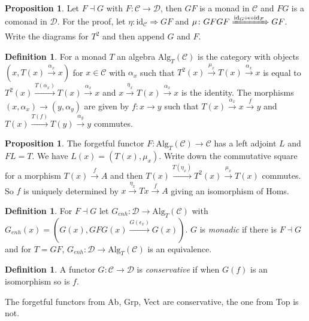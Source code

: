 \documentclass[a4paper,10pt]{article}
\theoremstyle{definition}
\newtheorem{definition}[theorem]{Definition}
\newtheorem{proposition}[theorem]{Proposition}
\newcommand{\C}{\mathcal{C}}
\newcommand{\D}{\mathcal{D}}
\newcommand{\id}{\mathrm{id}}
\begin{document}
\begin{proposition}
    Let $F \dashv G$ with $F \colon \C \rightarrow \D$, then $GF$ is a monad in $\C$ and $FG$ is a comonad in $\D$.
    For the proof, let $\eta \colon \id_\C \Rightarrow GF$  and $\mu \colon GFGF \xRightarrow{\id_G \circ \epsilon \circ \id_F} GF$. Write the diagrams for $T^2$ and then append $G$ and $F$.
\end{proposition}

\begin{definition}
    For a monad $T$ an algebra $\mathrm{Alg}_T(\C)$ is the category with objects $(x, T(x) \xrightarrow {\alpha_x} x)$ for $x \in \C$ with $\alpha_x$ such that $T^2(x) \xrightarrow{\mu_x} T(x) \xrightarrow{\alpha_x} x$ is equal to $T^2(x) \xrightarrow{T(\alpha_x)} T(x) \xrightarrow{\alpha_x} x$ and $x \xrightarrow{\eta_x} T(x) \xrightarrow{\alpha_x} x$ is the identity. The morphisms $(x, \alpha_x) \rightarrow (y, \alpha_y)$ are given by $f \colon x \rightarrow y$ such that $T(x) \xrightarrow{\alpha_x} x \xrightarrow{f} y$ and $T(x) \xrightarrow{T(f)} T(y) \xrightarrow{\alpha_y} y$ commutes.
\end{definition}

\begin{proposition}
    The forgetful functor $F \colon \mathrm{Alg}_T(\C) \rightarrow \C$ has a left adjoint $L$ and $FL = T$.
    We have $L(x) = (T(x), \mu_x)$. Write down the commutative square for a morphism $T(x) \xrightarrow{f} A$ and then $T(x) \xrightarrow{T(\eta_x)} T^2(x) \xrightarrow{\mu_x} T(x)$ commutes. So $f$ is uniquely determined by $x \xrightarrow{\eta_x} Tx \xrightarrow{f} A$ giving an isomorphism of Homs.
\end{proposition}

\begin{definition}
    For $F \dashv G$ let $G_{\mathit{enh}} \colon \D \rightarrow \mathrm{Alg}_T(\C)$ with $G_{\mathit{enh}}(x) = (G(x), GFG(x) \xrightarrow{G(\epsilon_x)} G(x))$. $G$ is \emph{monadic} if there is $F \dashv G$ and for $T = GF$, $G_\mathit{enh} \colon \D \rightarrow \mathrm{Alg}_T(\C)$ is an equivalence.
\end{definition}

\begin{definition}
    A functor $G \colon \C \rightarrow \D$ is \emph{conservative} if when $G(f)$ is an isomorphism so is $f$.
\end{definition}
The forgetful functors from Ab, Grp, Vect are conservative, the one from Top is not.
\end{document}
